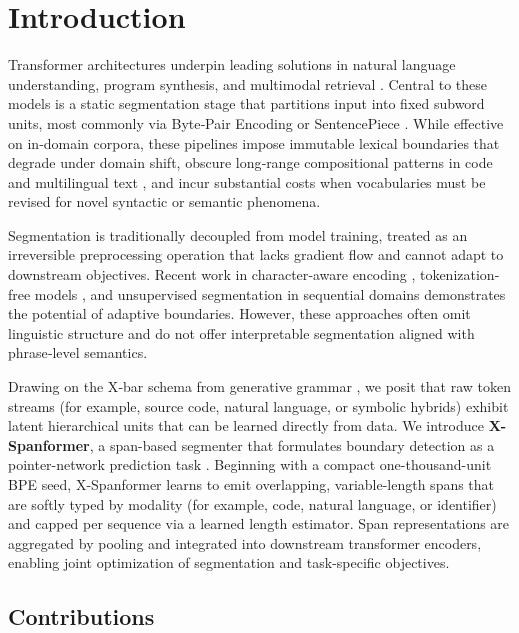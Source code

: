 \section{Introduction}

Transformer architectures underpin leading solutions in natural language understanding, program synthesis, and multimodal retrieval \cite{vaswani2017attention, devlin2019bert, radford2019gpt2, raffel2020t5}. Central to these models is a static segmentation stage that partitions input into fixed subword units, most commonly via Byte‐Pair Encoding \cite{sennrich2016bpe} or SentencePiece \cite{kudo2018sentencepiece}. While effective on in‐domain corpora, these pipelines impose immutable lexical boundaries that degrade under domain shift, obscure long‐range compositional patterns in code and multilingual text \cite{galle2021respite}, and incur substantial costs when vocabularies must be revised for novel syntactic or semantic phenomena.

Segmentation is traditionally decoupled from model training, treated as an irreversible preprocessing operation that lacks gradient flow and cannot adapt to downstream objectives. Recent work in character‐aware encoding \cite{taylor2021charformer}, tokenization‐free models \cite{clark2021canine}, and unsupervised segmentation in sequential domains \cite{liu2022learnedsegmentation, liu2022pmlm} demonstrates the potential of adaptive boundaries. However, these approaches often omit linguistic structure and do not offer interpretable segmentation aligned with phrase‐level semantics.

Drawing on the X‐bar schema from generative grammar \cite{jackendoff1977xbar}, we posit that raw token streams (for example, source code, natural language, or symbolic hybrids) exhibit latent hierarchical units that can be learned directly from data. We introduce \textbf{X-Spanformer}, a span-based segmenter that formulates boundary detection as a pointer-network prediction task \cite{vinyals2015pointer}. Beginning with a compact one-thousand-unit BPE seed, X-Spanformer learns to emit overlapping, variable-length spans that are softly typed by modality (for example, code, natural language, or identifier) and capped per sequence via a learned length estimator. Span representations are aggregated by pooling and integrated into downstream transformer encoders, enabling joint optimization of segmentation and task-specific objectives.

\subsection{Contributions}

